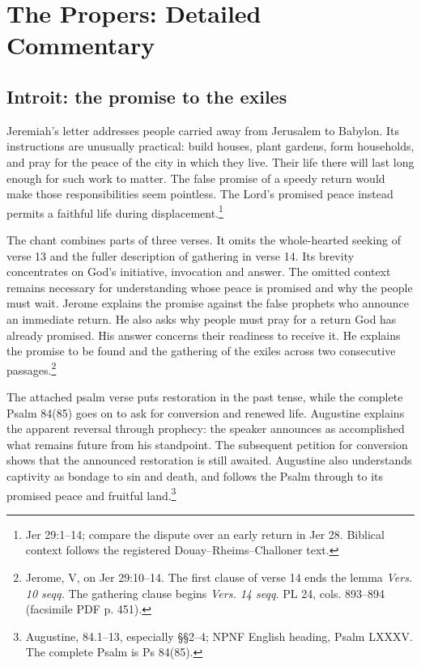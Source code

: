 \section{The Propers: Detailed Commentary}

\subsection{Introit: the promise to the exiles}

Jeremiah's letter addresses people carried away from Jerusalem to Babylon.
Its instructions are unusually practical: build houses, plant gardens,
form households, and pray for the peace of the city in which they live.
Their life there will last long enough for such work to matter. The false
promise of a speedy return would make those responsibilities seem
pointless. The Lord's promised peace instead permits a faithful life during
displacement.\footnote{Jer 29:1--14; compare the dispute over an early
return in Jer 28. Biblical context follows the registered
Douay--Rheims--Challoner text.}

The chant combines parts of three verses. It omits the whole-hearted
seeking of verse 13 and the fuller description of gathering in verse 14.
Its brevity concentrates on God's initiative, invocation and answer.
The omitted context remains necessary for understanding whose peace is
promised and why the people must wait. Jerome explains the promise against
the false prophets who announce an immediate return. He also asks why
people must pray for a return God has already promised. His answer
concerns their readiness to receive it. He explains the promise to be
found and the gathering of the exiles across two consecutive
passages.\footnote{Jerome,  V, on Jer 29:10--14.
The first clause of verse 14 ends the lemma \textit{Vers. 10 seqq.}
The gathering clause begins \textit{Vers. 14 seqq.} PL 24,
cols. 893--894 (facsimile PDF p. 451).}

The attached psalm verse puts restoration in the past tense, while the
complete Psalm 84(85) goes on to ask for conversion and renewed life.
Augustine explains the apparent reversal through prophecy: the speaker
announces as accomplished what remains future from his standpoint.
The subsequent petition for conversion shows that the announced restoration
is still awaited. Augustine also understands captivity as bondage to sin
and death, and follows the Psalm through to its promised peace and fruitful
land.\footnote{Augustine,  84.1--13,
especially §§2--4; NPNF English heading, Psalm LXXXV. The complete Psalm
is Ps 84(85).}

